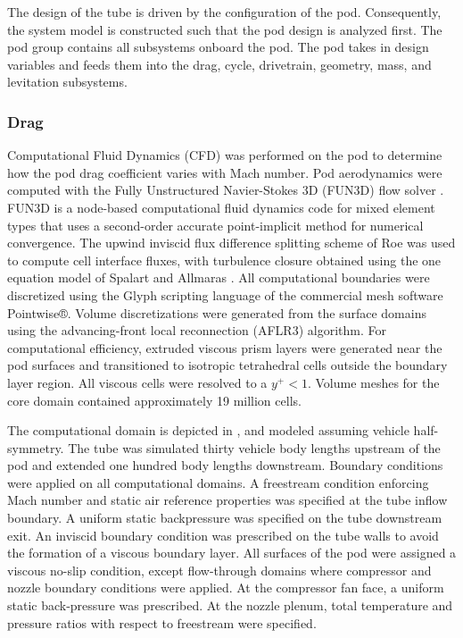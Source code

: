 
	 The design of the tube is driven by the configuration of the pod.
	 Consequently, the system model is constructed such that the pod design is analyzed first.
	 The pod group contains all subsystems onboard the pod.
	 The pod takes in design variables and feeds them into the drag, cycle,
	 drivetrain, geometry, mass, and levitation subsystems.

\subsubsection{Drag}
	Computational Fluid Dynamics (CFD) was performed on the pod to determine
	how the pod drag coefficient varies with Mach number.
	Pod aerodynamics were computed with the Fully Unstructured Navier-Stokes 3D
	(FUN3D) flow solver \cite{Biedron}. FUN3D is a node-based computational fluid dynamics
	code for mixed element types that uses a second-order accurate point-implicit
	method for numerical convergence. The upwind inviscid flux difference
	splitting scheme of Roe \cite{Roe} was used to compute cell interface fluxes,
	with turbulence closure obtained using the one equation model of Spalart
	and Allmaras \cite{Spalart}.
	All computational boundaries were discretized using the Glyph scripting
	language of the commercial mesh software Pointwise®. Volume discretizations
	were generated from the surface domains using the advancing-front local
	reconnection (AFLR3)\cite{Marcum} algorithm. For computational efficiency, extruded
	viscous prism layers were generated near the pod surfaces and transitioned
	to isotropic tetrahedral cells outside the boundary layer region.
	All viscous cells were resolved to a $y^{+} < 1$. Volume meshes for the core
	domain contained approximately 19 million cells.

	The computational domain is depicted in ,
	and modeled assuming vehicle half-symmetry.
	The tube was simulated thirty vehicle body lengths upstream of the pod
	and extended one hundred body lengths downstream. Boundary conditions were
	applied on all computational domains. A freestream condition enforcing Mach
	number and static air reference properties was specified at the tube inflow boundary.
	A uniform static backpressure was specified on the tube downstream exit.
	An inviscid boundary condition was prescribed on the tube walls to avoid
	the formation of a viscous boundary layer. All surfaces of the pod were
	assigned a viscous no-slip condition, except flow-through domains where
	compressor and nozzle boundary conditions were applied. At the compressor
	fan face, a uniform static back-pressure was prescribed. At the nozzle plenum,
	total temperature and pressure ratios with respect to freestream were specified.

